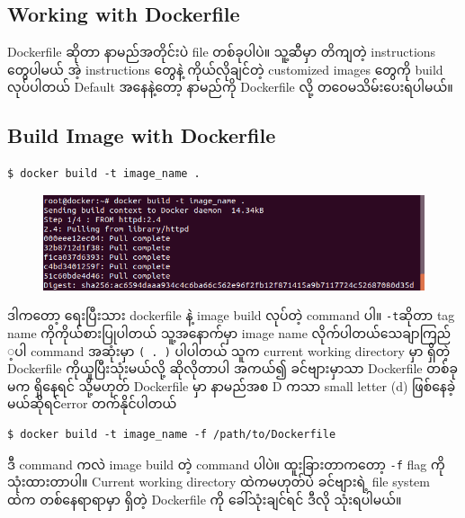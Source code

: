 \documentclass{article}
\begin{document}
\subsection{Working with Dockerfile}\label{working-with-dockerfile}

Dockerfile ဆိုတာ နာမည်​အတိုင်းပဲ file တစ်​ခုပါပဲ။ သူ့ဆီမှာ တိကျတဲ့
instructions ​တွေပါမယ်​ အဲ့ instructions ​တွေနဲ့ ကိုယ်​လိုချင်​တဲ့
customized images ​တွေကို​ build လုပ်​ပါတယ်​ Default အ​နေနဲ့​တော့
နာမည်​ကို Dockerfile လို့ တ​ဝေမသိမ်း​ပေးရပါမယ်​။

\subsection{Build Image with
Dockerfile}\label{build-image-with-dockerfile}

\begin{verbatim}
$ docker build -t image_name .
\end{verbatim}

\begin{figure}[htbp]
\centering
\includegraphics[width=0.70\paperwidth]{.gitbook/assets/1_docker_build.png}
\end{figure}

ဒါက​တော့ ​ရေးပြီးသား dockerfile နဲ့ image build လုပ်​တဲ့ command ပါ။
\texttt{-t}ဆိုတာ tag name ကိုကိုယ်​စားပြုပါတယ်​ သူ့အ​နောက်​မှာ image
name လိုက်​ပါတယ်​ ​သေချာကြည်​့ပါ command အဆုံးမှာ \texttt{( . )}
ပါပါတယ်​ သူက current working directory မှာ ရှိတဲ့ Dockerfile
ကိုယူပြီးသုံးမယ်​လို့ ဆိုလိုတာပါ အကယ်​၍ ခင်​​ဗျားမှာသာ Dockerfile
တစ်​ခုမက ရှိ​နေရင်​ သို့မဟုတ်​ Dockerfile မှာ နာမည်​အစ D ကသာ small
letter (d) ဖြစ်​​နေခဲ့မယ်​ဆိုရင်​ error တက်​နိုင်​ပါတယ်​

\begin{verbatim}
$ docker build -t image_name -f /path/to/Dockerfile
\end{verbatim}

ဒီ command ကလဲ image build တဲ့ command ပါပဲ။ ထူးခြားတာက​တော့ \texttt{-f}
flag ကိုသုံးထားတာပါ။ Current working directory ထဲကမဟုတ်​ပဲ ခင်​​ဗျားရဲ့
file system ထဲက တစ်​​နေရာရာမှာ ရှိတဲ့ Dockerfile ကို ​ခေါ်သုံးချင်​ရင်​
ဒီလို သုံးရပါမယ်​။
\end{document}
